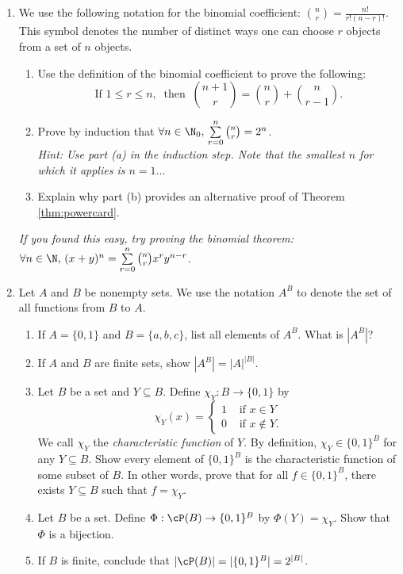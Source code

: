 \begin{enumerate}
	\item\label{ex:binom} We use the following notation for the binomial coefficient: $\binom nr=\frac{n!}{r!(n-r)!}$. This symbol denotes the number of distinct ways one can choose $r$ objects from a set of $n$ objects.
	\begin{enumerate}
	  \item Use the definition of the binomial coefficient to prove the following:
	  \[\text{If } 1\le r\le n,\ \text{ then }\ \binom{n+1}r=\binom nr+\binom n{r-1}.\]
		\item Prove by induction that $\forall n\in\N_0,\,\sum\limits_{r=0}^n\binom nr=2^n$.\\
		\emph{Hint: Use part (a) in the induction step. Note that the smallest $n$ for which it applies is $n=1\ldots$}
		\item Explain why part (b) provides an alternative proof of Theorem \ref{thm:powercard}.
	\end{enumerate}
	\emph{If you found this easy, try proving the binomial theorem: $\forall n\in\N,\,(x+y)^n=\sum\limits_{r=0}^n\binom nrx^ry^{n-r}$.}
	
	\item Let $A$ and $B$ be nonempty sets. We use the notation $A^B$ to denote the set of all functions from $B$ to $A$. 
\begin{enumerate}
    \item If $A = \{0,1\}$ and $B = \{a,b,c\}$, list all elements of $A^B$. What is $|A^B|$?
    \item If $A$ and $B$ are finite sets, show $|A^B| = |A|^{|B|}$.
    \item Let $B$ be a set and $Y \subseteq B$. Define $\chi_Y : B \to \{0,1\}$ by
    \[
        \chi_Y(x) = \begin{cases}
        1 & \text{ if } x \in Y \\
        0 & \text{ if } x \notin Y.
        \end{cases}
    \]
    We call $\chi_Y$ the \emph{characteristic function} of $Y$. By definition, $\chi_Y \in \{0,1\}^B$ for any $Y \subseteq B$. Show every element of $\{0,1\}^B$ is the characteristic function of some subset of $B$. In other words, prove that for all $f \in \{0,1\}^B$, there exists $Y \subseteq B$ such that $f = \chi_Y$.
    \item Let $B$ be a set. Define $\Phi : \cP(B) \to \{0,1\}^B$ by $\Phi(Y) = \chi_Y$. Show that $\Phi$ is a bijection.
    \item If $B$ is finite, conclude that $|\cP(B)| = |\{0,1\}^B| = 2^{|B|}$.
\end{enumerate}


\end{enumerate}
